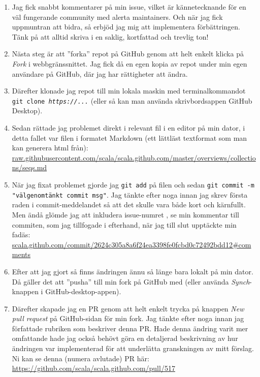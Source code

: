 \begin{enumerate}
\item Jag fick snabbt kommentarer på min issue, vilket är kännetecknande för en väl fungerande community med alerta maintainers. Och när jag fick uppmuntran att bidra, så erbjöd jag mig att implementera förbättringen. Tänk på att alltid skriva i en saklig, kortfattad och trevlig ton!

\item Nästa steg är att ''forka'' repot på GitHub genom att helt enkelt klicka på \emph{Fork} i webbgränssnittet. Jag fick då en egen kopia av repot under min egen användare på GitHub, där jag har rättigheter att ändra. 

\item Därefter klonade jag repot till min lokala maskin med terminalkommandot \texttt{ git clone \emph{https://...}} (eller så kan man använda skrivbordsappen GitHub Desktop).

\item Sedan rättade jag problemet direkt i relevant fil i en editor på min dator, i detta fallet var filen i formatet Markdown (ett lättläst textformat som man kan generera html från): \\ {\small\href{https://raw.githubusercontent.com/scala/scala.github.com/master/overviews/collections/seqs.md}{raw.githubusercontent.com/scala/scala.github.com/master/overviews/collections/seqs.md}}

\item När jag fixat problemet gjorde jag \texttt{git add} på filen och sedan \texttt{git commit -m "välgenomtänkt commit msg"}.  Jag tänkte efter noga innan jag skrev första raden i commit-meddelandet så att det skulle vara både kort och kärnfullt. Men ändå glömde jag att inkludera issue-numret \code{:(}, se min kommentar till commiten, som jag tillfogade i efterhand, när jag till slut upptäckte min fadäs:\\ {\small\href{https://github.com/bjornregnell/scala.github.com/commit/2624c305a8a6f24ea3398fe0fcbd0c72492bdd12#comments}{scala.github.com/commit/2624c305a8a6f24ea3398fe0fcbd0c72492bdd12\#comments}}

\item Efter att jag gjort  så finns ändringen ännu så länge bara lokalt på min dator. Då gäller det att ''pusha'' till min fork på GitHub med  (eller använda \emph{Synch}-knappen i GitHub-desktop-appen).

\item Därefter skapade jag en PR genom att helt enkelt trycka på knappen \emph{New pull request} på GitHub-sidan för min fork. Jag tänkte efter noga innan jag författade rubriken som beskriver denna PR. Hade denna ändring varit mer omfattande hade jag också behövt göra en detaljerad beskrivning av hur ändringen var implementerad för att underlätta granskningen av mitt förslag. Ni kan se denna (numera avlutade) PR här: \\{\url{https://github.com/scala/scala.github.com/pull/517}}


\end{enumerate}
